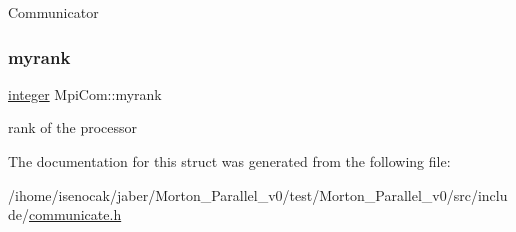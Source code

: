 Communicator \mbox{\label{structMpiCom_a32d8c35d746952fd9b435e25fc1fe54b}} 
\subsubsection{\texorpdfstring{myrank}{myrank}}
{\footnotesize\ttfamily \mbox{\hyperlink{definitions_8h_adbd822dbdb8152553a0f77b84915bd8d}{integer}} Mpi\+Com\+::myrank}

rank of the processor 

The documentation for this struct was generated from the following file\+:\begin{DoxyCompactItemize}
\item 
/ihome/isenocak/jaber/\+Morton\+\_\+\+Parallel\+\_\+v0/test/\+Morton\+\_\+\+Parallel\+\_\+v0/src/include/\mbox{\hyperlink{communicate_8h}{communicate.\+h}}\end{DoxyCompactItemize}
